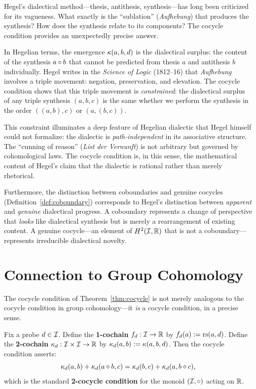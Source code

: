 \begin{interpretation}\label{interp:ch2:hegel_dialectic}
Hegel's dialectical method---thesis, antithesis, synthesis---has long
been criticized for its vagueness. What exactly is the ``sublation''
(\emph{Aufhebung}) that produces the synthesis? How does the synthesis
relate to its components? The cocycle condition provides an unexpectedly
precise answer.

In Hegelian terms, the emergence $\kappa(a, b, d)$ is the dialectical
surplus: the content of the synthesis $a \circ b$ that cannot be
predicted from thesis $a$ and antithesis $b$ individually. Hegel writes
in the \emph{Science of Logic} (1812--16) that \emph{Aufhebung} involves
a triple movement: negation, preservation, and elevation. The cocycle
condition shows that this triple movement is \emph{constrained}: the
dialectical surplus of any triple synthesis $(a, b, c)$ is the same
whether we perform the synthesis in the order $((a,b),c)$ or $(a,(b,c))$.

This constraint illuminates a deep feature of Hegelian dialectic that
Hegel himself could not formalize: the dialectic is \emph{path-independent}
in its associative structure. The ``cunning of reason'' (\emph{List der
Vernunft}) is not arbitrary but governed by cohomological laws. The cocycle
condition is, in this sense, the mathematical content of Hegel's claim that
the dialectic is rational rather than merely rhetorical.

Furthermore, the distinction between coboundaries and genuine cocycles
(Definition~\ref{def:coboundary}) corresponds to Hegel's distinction
between \emph{apparent} and \emph{genuine} dialectical progress. A
coboundary represents a change of perspective that \emph{looks} like
dialectical synthesis but is merely a rearrangement of existing content.
A genuine cocycle---an element of $H^2(\mathcal{I}, \mathbb{R})$ that is not a
coboundary---represents irreducible dialectical novelty.
\end{interpretation}

\section{Connection to Group Cohomology}

The cocycle condition of Theorem~\ref{thm:cocycle} is not merely
analogous to the cocycle condition in group cohomology---it \emph{is}
a cocycle condition, in a precise sense.

\begin{definition}
Fix a probe $d \in \mathcal{I}$. Define the \textbf{1-cochain} $f_d : \mathcal{I} \to \mathbb{R}$
by $f_d(a) := \mathrm{rs}(a, d)$. Define the \textbf{2-cochain}
$\kappa_d : \mathcal{I} \times \mathcal{I} \to \mathbb{R}$ by $\kappa_d(a,b) := \kappa(a,b,d)$.
Then the cocycle condition asserts:
\[
    \kappa_d(a, b) + \kappa_d(a \circ b, c) =
    \kappa_d(b, c) + \kappa_d(a, b \circ c),
\]
which is the standard \textbf{2-cocycle condition} for the monoid
$(\mathcal{I}, \circ)$ acting on $\mathbb{R}$.
\end{definition}


